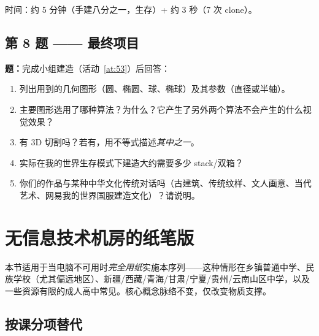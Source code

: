 \documentclass[12pt,a4paper]{scrartcl}
\begin{document}
时间：约 5 分钟（手建八分之一，生存）+ 约 3 秒（7 次 clone）。

\subsection*{第 8 题 —— 最终项目}
\textbf{题：}完成小组建造（活动~\ref{at:53}）后回答：
\begin{enumerate}[label=(\arabic*),leftmargin=1.7em,itemsep=0.15em,topsep=0.2em,nosep]
  \item 列出用到的几何图形（圆、椭圆、球、椭球）及其参数（直径或半轴）。
  \item 主要图形选用了哪种算法？为什么？它产生了另外两个算法不会产生的什么视觉效果？
  \item 有 3D 切割吗？若有，用不等式描述\emph{其中之一}。
  \item 实际在我的世界生存模式下建造大约需要多少 stack/双箱？
  \item 你们的作品与某种中华文化传统对话吗（古建筑、传统纹样、文人画意、当代艺术、网易我的世界国服建造文化）？请说明。
\end{enumerate}

\newpage
\section{无信息技术机房的纸笔版}\label{ap:adapt-analog}

本节适用于当电脑不可用时\emph{完全用纸}实施本序列——这种情形在乡镇普通中学、民族学校（尤其偏远地区）、新疆/西藏/青海/甘肃/宁夏/贵州/云南山区中学，以及一些资源有限的成人高中常见。核心概念脉络不变，仅改变物质支撑。

\subsection{按课分项替代}
\end{document}
